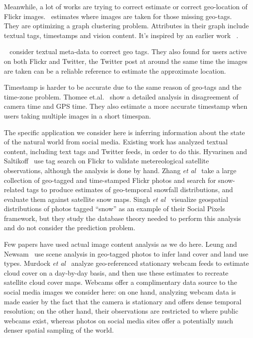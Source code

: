 \documentclass[10pt,journal,compsoc]{IEEEtran}
\begin{document}
Meanwhile, a lot of works are trying to correct estimate or correct geo-location of Flickr images.
~\cite{singh2010geo}estimates where images are taken for those missing geo-tags. They are optimizing a graph clustering problem. Attributes in their graph include textual tags, timestamps and vision content. It's inspired by an earlier work ~\cite{crandall2009mapping}.

~\cite{hauff2012geo} consider textual meta-data to correct geo tags. 
They also found for users active on both Flickr and Twitter, the Twitter post at around the same time the images are taken can be a reliable reference to estimate the approximate location.

Timestamp is harder to be accurate due to the same reason of geo-tags and the time-zone problem. 
Thomee et.al.~\cite{thomee_time2014}  show  a detailed analysis in disagreement of camera time and GPS time. They also estimate a more accurate timestamp when users taking multiple images in a short timespan.





The specific application we consider here is inferring
information about the state of the natural world from social media.
Existing work has analyzed textual content, including text tags and
Twitter feeds, in order to do this. Hyvarinen and
Saltikoff~\cite{meteo} use tag search on Flickr to validate
metereological satellite observations, although the analysis is done
by hand. Zhang \textit{et al}~\cite{ecology2012www} take a large
collection of geo-tagged and time-stamped Flickr photos and search for
snow-related tags to produce estimates of geo-temporal snowfall
distributions, and evaluate them against satellite snow maps.
Singh \textit{et al}~\cite{singh10socialpixels} visualize geospatial
distributions of photos tagged ``snow'' as an example of
their Social Pixels framework, but they study the
database theory needed to perform this analysis
and do not consider the prediction problem.  


Few papers have used actual image content
analysis as we do here. Leung and Newsam~\cite{Leung:2010wa} use scene
analysis in geo-tagged photos to infer land cover and land use types.
Murdock \textit{et al}~\cite{murdock} analyze  geo-referenced
stationary webcam feeds to estimate cloud cover on a day-by-day
basis, and then use these estimates to recreate satellite cloud cover
maps.  Webcams offer a complimentary data source to the social media
images we consider here: on one hand, analyzing webcam data is made
easier by the fact that the camera is stationary and offers dense
temporal resolution; on the other hand, their observations are restricted to 
where public webcams exist, whereas photos on social media sites 
offer a potentially much denser spatial sampling of the world.
\end{document}
